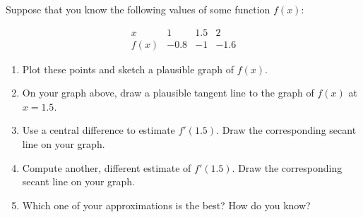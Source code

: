 Suppose that you know the following values of some function $f(x)$:

\[
\begin{array}{c||r|r|r}
      x  &  1 &  1.5   &  2 \\\hline
    f(x) & -0.8 & -1   & -1.6
\end{array}
\]
\begin{enumerate}[leftmargin=0pt]

\item Plot these points and sketch a plausible graph of $f(x)$.


\item On your graph above, draw a plausible tangent line to the graph of $f(x)$ at $x=1.5$.

\item Use a central difference to estimate $f'(1.5)$. Draw the corresponding secant line on your graph.
\vfill

\item Compute another, different estimate of $f'(1.5)$. Draw the corresponding secant line on your graph.

\vfill

\item Which one of your approximations is the best? How do you know?

\vspace{1cm}

\end{enumerate}

